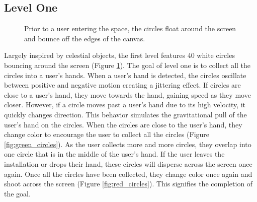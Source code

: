 \documentclass[10pt,twocolumn]{article}
\begin{document}
\subsection{Level One}

\begin{figure}[hbh]
\begin{center}
\vspace{.5cm}
\caption{Prior to a user entering the space, the circles float around the screen and bounce off the edges of the canvas.}
\label{fig:white_circles}
\end{center}
\end{figure} 

Largely inspired by celestial objects, the first level features 40 white circles bouncing around the screen (Figure \ref{fig:white_circles}).  The goal of level one is to collect all the circles into a user's hands. When a user's hand is detected, the circles oscillate between positive and negative motion creating a jittering effect.  If circles are close to a user's hand, they move towards the hand, gaining speed as they move closer.  However, if a circle moves past a user's hand due to its high velocity, it quickly changes direction.  This behavior simulates the gravitational pull of the user's hand on the circles.  When the circles are close to the user's hand, they change color to encourage the user to collect all the circles (Figure \ref{fig:green_circles}). As the user collects more and more circles, they overlap into one circle that is in the middle of the user's hand. If the user leaves the installation or drops their hand, these circles will disperse across the screen once again.  Once all the circles have been collected, they change color once again and shoot across the screen (Figure \ref{fig:red_circles}).  This signifies the completion of the goal.  
\end{document}
